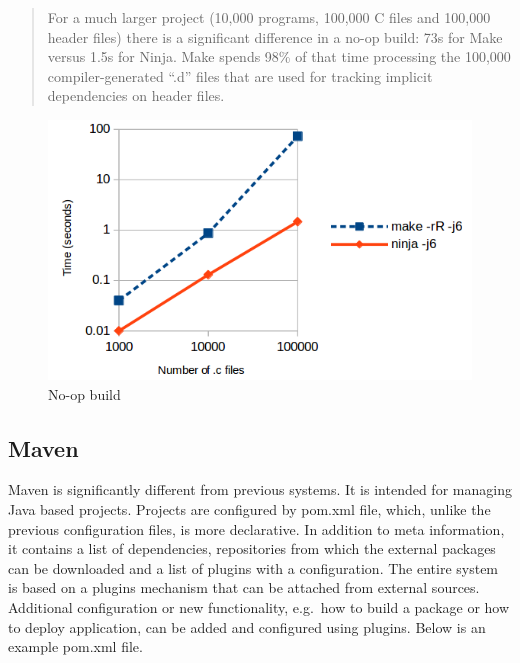 \begin{quote}
For a much larger project (10,000 programs, 100,000 C files and 100,000
header files) there is a significant difference in a no-op build: 73s
for Make versus 1.5s for Ninja. Make spends 98\% of that time processing
the 100,000 compiler-generated ``.d'' files that are used for tracking
implicit dependencies on header files.
\end{quote}

\begin{figure}
\centering
\includegraphics{./no-op-build.png}
\caption{No-op build}
\end{figure}

\hypertarget{maven}{%
\subsection{Maven}\label{maven}}

Maven is significantly different from previous systems. It is intended
for managing Java based projects. Projects are configured by pom.xml
file, which, unlike the previous configuration files, is more
declarative. In addition to meta information, it contains a list of
dependencies, repositories from which the external packages can be
downloaded and a list of plugins with a configuration. The entire system
is based on a plugins mechanism that can be attached from external
sources. Additional configuration or new functionality, e.g.~how to
build a package or how to deploy application, can be added and
configured using plugins. Below is an example pom.xml file.

